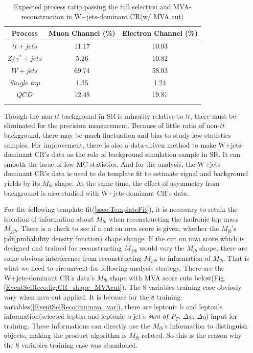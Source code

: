 		\begin{center}
		\begin{longtable}[H]{ c c c }
		\caption{Expected process ratio passing the full selection and MVA-reconstruction in W+jets-dominant CR(w/ MVA cut)}\\
		\hline
		 Process & Muon Channel (\%) & Electron Channel (\%) \\ 
		\hline
		 $t\bar{t}+jets$ & 11.17 & 10.03 \\
		 $Z/\gamma^{*}+jets$ & 5.26 &  10.82 \\
		 $W+jets$ & 69.74 & 58.03 \\
		 $Single$ $top$ & 1.35 & 1.24 \\
		 $QCD$ & 12.48 & 19.87 \\
		\hline
		\label{EventSelReco:tb:MC_process_CR_a05_MLP_1C}
		\end{longtable}
		\end{center}
		\FloatBarrier

		Though the non-$t\bar{t}$ background in SR is minority relative to $t\bar{t}$, there must be eliminated for the precision measurement. Because of little ratio of non-$t\bar{t}$ background, there may be much fluctuation and bias to study low statistics samples. For improvement, there is also a data-driven method to make W+jets-dominant CR's data as the role of background simulation sample in SR. It can smooth the issue of low MC statistics. And for the analysis, the W+jets-dominant CR's data is used to do template fit to estimate signal and background yields by its $M_{lb}$ shape. At the same time, the effect of asymmetry from background is also studied with W+jets-dominant CR's data.

		For the following template fit(\ref{ssec:TemplateFit}), it is necessary to retain the isolation of information about $M_{lb}$ when reconstructing the hadronic top mass $M_{jjb}$. There is a check to see if a cut on mva score is given, whether the $M_{lb}$'s pdf(probability density function) shape change. If the cut on mva score which is designed and trained for reconstructing $M_{jjb}$ would vary the $M_{lb}$ shape, there are some obvious interference from reconstructing $M_{jjb}$ to information of $M_{lb}$. That is what we need to circumvent for following analysis strategy. There are the W+jets-dominant CR's data's $M_{lb}$ shape with MVA score cuts below(Fig.\ref{EventSelReco:fig:CR_shape_MVAcut}). The 8 variables training case obviosly vary when mva-cut applied. It is because for the 8 training variables(\ref{EventSelReco:itm:mva_var}), there are leptonic b and lepton's information(selected lepton and leptonic b-jet's $\emph{sum of}$ $P_{T}$, $\Delta \phi$, $\Delta \eta$) input for training. These informations can directly use the $M_{lb}$'s information to distinguish objects, making the product algorithm is $M_{lb}$-related. So this is the reason why the 8 variables training case was abandoned.

